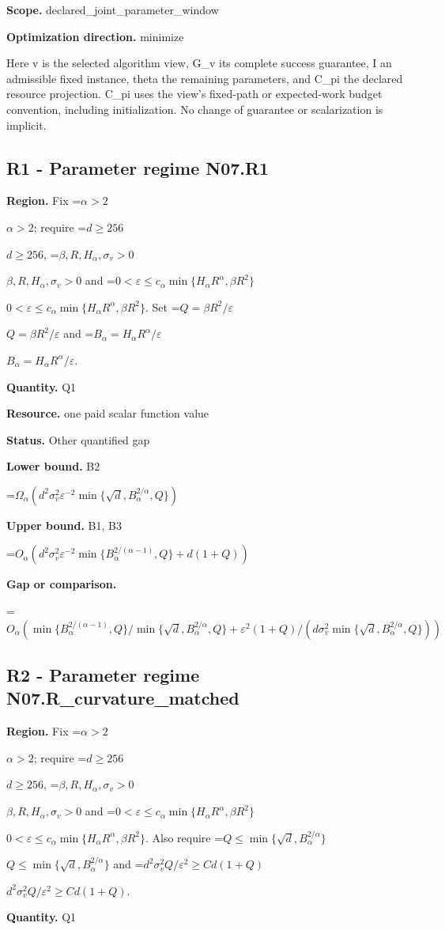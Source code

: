 \documentclass[10pt,a4paper]{article}
\newcommand{\AtlasMath}[1]{\par\begingroup\centering\setbox0=\hbox{$\displaystyle #1$}\ifdim\wd0>1.4\linewidth\typeout{ATLAS WIDE FORMULA: \the\wd0}\fi\ifdim\wd0>\linewidth\resizebox{\linewidth}{!}{\box0}\else\box0\fi\par\endgroup}
\newcommand{\AtlasInlineMath}[1]{\begingroup\setbox0=\hbox{$#1$}\ifdim\wd0>.4\linewidth\endgroup\AtlasMath{#1}\else\endgroup$#1$\fi}
\begin{document}
\textbf{Scope.} declared\_joint\_parameter\_window

\textbf{Optimization direction.} minimize

Here v is the selected algorithm view, G\_v its complete success guarantee, I an admissible fixed instance, theta the remaining parameters, and C\_pi the declared resource projection. C\_pi uses the view's fixed-path or expected-work budget convention, including initialization. No change of guarantee or scalarization is implicit.

\subsection{R1 - Parameter regime N07.R1}
\textbf{Region.} Fix \AtlasInlineMath{\alpha>2}; require \AtlasInlineMath{d\ge256}, \AtlasInlineMath{\beta,R,H_\alpha,\sigma_v>0} and \AtlasInlineMath{0<\varepsilon\le c_\alpha\min\{H_\alpha R^\alpha,\beta R^2\}}. Set \AtlasInlineMath{Q=\beta R^2/\varepsilon} and \AtlasInlineMath{B_\alpha=H_\alpha R^\alpha/\varepsilon}.

\textbf{Quantity.} Q1

\textbf{Resource.} one paid scalar function value

\textbf{Status.} Other quantified gap

\textbf{Lower bound.} B2

\AtlasMath{\Omega_\alpha(d^2\sigma_v^2\varepsilon^{-2}\min\{\sqrt d,B_\alpha^{2/\alpha},Q\})}
\textbf{Upper bound.} B1, B3

\AtlasMath{O_\alpha(d^2\sigma_v^2\varepsilon^{-2}\min\{B_\alpha^{2/(\alpha-1)},Q\}+d(1+Q))}
\textbf{Gap or comparison.} 
\AtlasMath{O_\alpha(\min\{B_\alpha^{2/(\alpha-1)},Q\}/\min\{\sqrt d,B_\alpha^{2/\alpha},Q\}+\varepsilon^2(1+Q)/(d\sigma_v^2\min\{\sqrt d,B_\alpha^{2/\alpha},Q\}))}


\subsection{R2 - Parameter regime N07.R\_curvature\_matched}
\textbf{Region.} Fix \AtlasInlineMath{\alpha>2}; require \AtlasInlineMath{d\ge256}, \AtlasInlineMath{\beta,R,H_\alpha,\sigma_v>0} and \AtlasInlineMath{0<\varepsilon\le c_\alpha\min\{H_\alpha R^\alpha,\beta R^2\}}. Also require \AtlasInlineMath{Q\le\min\{\sqrt d,B_\alpha^{2/\alpha}\}} and \AtlasInlineMath{d^2\sigma_v^2Q/\varepsilon^2\ge Cd(1+Q)}.

\textbf{Quantity.} Q1
\end{document}
